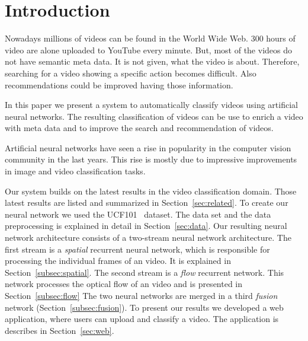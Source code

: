 \section{Introduction}
\label{sec:introduction}

Nowadays millions of videos can be found in the World Wide Web.
300 hours of video are alone uploaded to YouTube every minute.
But, most of the videos do not have semantic meta data.
It is not given, what the video is about.
Therefore, searching for a video showing a specific action becomes difficult.
Also recommendations could be improved having those information.

In this paper we present a system to automatically classify videos using artificial neural networks.
The resulting classification of videos can be use to enrich a video with meta data and to improve the search and recommendation of videos.

Artificial neural networks have seen a rise in popularity in the computer vision community in the last years.
This rise is mostly due to impressive improvements in image and video classification tasks.

Our system builds on the latest results in the video classification domain.
Those latest results are listed and summarized in Section~\ref{sec:related}.
To create our neural network we used the UCF101~\cite{soomro2012ucf101} dataset.
The data set and the data preprocessing is explained in detail in Section~\ref{sec:data}.
Our resulting neural network architecture consists of a two-stream neural network architecture.
The first stream is a \emph{spatial} recurrent neural network, which is responsible for processing the individual frames of an video.
It is explained in Section~\ref{subsec:spatial}.
The second stream is a \emph{flow} recurrent network.
This network processes the optical flow of an video and is presented in Section~\ref{subsec:flow}
The two neural networks are merged in a third \emph{fusion} network (Section~\ref{subsec:fusion}).
To present our results we developed a web application, where users can upload and classify a video.
The application is describes in Section~\ref{sec:web}.



